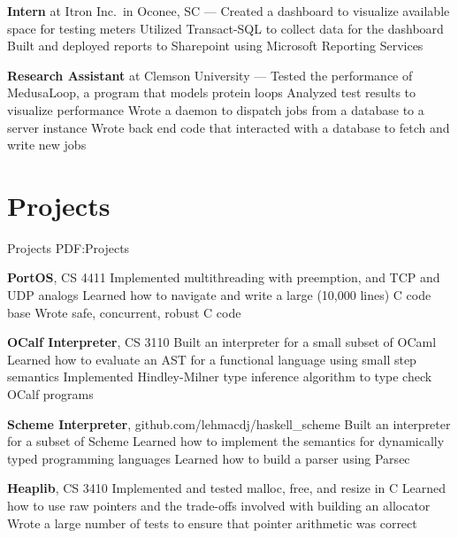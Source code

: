 \documentclass[letterpaper,10pt,oneside]{simpleresume}
\begin{document}
\begin{minipage}[t][0pt]{\linewidth}
\begin{body}
\textbf{Intern} at Itron Inc.\ in Oconee, SC
\hfill
{} --- 
\BulletItem%
Created a dashboard to visualize available space for testing meters
\BulletItem%
Utilized Transact-SQL to collect data for the dashboard
\BulletItem%
Built and deployed reports to Sharepoint using Microsoft Reporting Services

\textbf{Research Assistant} at Clemson University
\hfill
{} --- 
\BulletItem%
Tested the performance of MedusaLoop, a program that models protein loops
\BulletItem%
Analyzed test results to visualize performance
\BulletItem%
Wrote a daemon to dispatch jobs from a database to a server instance
\BulletItem%
Wrote back end code that interacted with a database to fetch and write new jobs

\section%
{Projects}
{Projects}
{PDF:Projects}

\textbf{PortOS}, CS 4411
\BulletItem%
Implemented multithreading with preemption, and TCP and UDP analogs
\BulletItem%
Learned how to navigate and write a large (10,000 lines) C code base
\BulletItem%
Wrote safe, concurrent, robust C code
\GapNoBreak%

\textbf{OCalf Interpreter}, CS 3110
\BulletItem%
Built an interpreter for a small subset of OCaml
\BulletItem%
Learned how to evaluate an AST for a functional language using small step
semantics
\BulletItem%
Implemented Hindley-Milner type inference algorithm to type check OCalf programs
\GapNoBreak%

\textbf{Scheme Interpreter}, github.com/lehmacdj/haskell\_scheme
\BulletItem%
Built an interpreter for a subset of Scheme
\BulletItem%
Learned how to implement the semantics for dynamically typed programming
languages
\BulletItem%
Learned how to build a parser using Parsec
\GapNoBreak%

\textbf{Heaplib}, CS 3410
\BulletItem%
Implemented and tested malloc, free, and resize in C
\BulletItem%
Learned how to use raw pointers and the trade-offs involved with building
an allocator
\BulletItem%
Wrote a large number of tests to ensure that pointer arithmetic was correct
\GapNoBreak%



\end{body}
\end{minipage}
\end{document}
